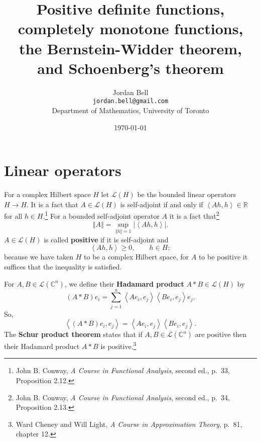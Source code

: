 \documentclass{article}
\newcommand{\inner}[2]{\left\langle #1, #2 \right\rangle}
\newcommand{\norm}[1]{\left\Vert #1 \right\Vert}
\theoremstyle{definition}
\begin{document}
\title{Positive definite functions, completely monotone functions, the Bernstein-Widder theorem, and Schoenberg's theorem}
\author{Jordan Bell\\ \texttt{jordan.bell@gmail.com}\\Department of Mathematics, University of Toronto}
\date{\today}

\maketitle

\section{Linear operators}
For a complex Hilbert space $H$ let $\mathscr{L}(H)$ be the bounded linear operators
$H \to H$. It is a fact that $A \in \mathscr{L}(H)$ is self-adjoint if and only if $\inner{Ah}{h} \in \mathbb{R}$ for all
$h \in H$.\footnote{John B. Conway, {\em A Course in Functional Analysis}, second ed., p.~33, Proposition 2.12.}
For a bounded self-adjoint operator $A$ it is a fact
that\footnote{John B. Conway, {\em A Course in Functional Analysis}, second ed., p.~34, Proposition 2.13.}
\[
\norm{A} = \sup_{\norm{h} = 1} |\inner{Ah}{h}|.
\]
$A \in \mathscr{L}(H)$ is called \textbf{positive} if it is self-adjoint and 
\[
\inner{Ah}{h} \geq 0, \qquad h \in H;
\]
because we have taken $H$ to be a complex Hilbert space,  for $A$ to be positive it suffices that the inequality is satisfied. 

For $A,B \in \mathscr{L}(\mathbb{C}^n)$, we define
their \textbf{Hadamard product} $A * B \in \mathscr{L}(H)$ by
\[
(A*B)e_i = \sum_{j=1}^n \inner{Ae_i}{e_j} \inner{Be_i}{e_j} e_j.
\]
So,
\[
\inner{(A*B)e_i}{e_j} = \inner{Ae_i}{e_j} \inner{Be_i}{e_j}.
\]
The \textbf{Schur product theorem} states that if $A,B \in \mathscr{L}(\mathbb{C}^n)$ are positive then
their Hadamard product $A * B$ is positive.\footnote{Ward Cheney and Will Light, {\em A Course
in Approximation Theory}, p.~81, chapter 12.}
\end{document}
